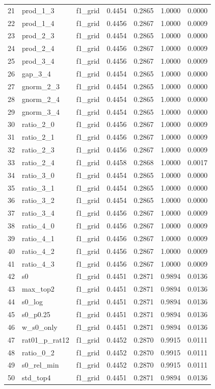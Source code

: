 \documentclass[11pt,a4paper]{article}
\begin{document}
\begin{table}[htbp]
\begin{tabular}{@{}rllrrrr@{}}
21 & prod\_1\_3 & f1\_grid & 0.4454 & 0.2865 & 1.0000 & 0.0000 \\
22 & prod\_1\_4 & f1\_grid & 0.4456 & 0.2867 & 1.0000 & 0.0009 \\
23 & prod\_2\_3 & f1\_grid & 0.4454 & 0.2865 & 1.0000 & 0.0000 \\
24 & prod\_2\_4 & f1\_grid & 0.4456 & 0.2867 & 1.0000 & 0.0009 \\
25 & prod\_3\_4 & f1\_grid & 0.4456 & 0.2867 & 1.0000 & 0.0009 \\
26 & gap\_3\_4 & f1\_grid & 0.4454 & 0.2865 & 1.0000 & 0.0000 \\
27 & gnorm\_2\_3 & f1\_grid & 0.4454 & 0.2865 & 1.0000 & 0.0000 \\
28 & gnorm\_2\_4 & f1\_grid & 0.4454 & 0.2865 & 1.0000 & 0.0000 \\
29 & gnorm\_3\_4 & f1\_grid & 0.4454 & 0.2865 & 1.0000 & 0.0000 \\
30 & ratio\_2\_0 & f1\_grid & 0.4456 & 0.2867 & 1.0000 & 0.0009 \\
31 & ratio\_2\_1 & f1\_grid & 0.4456 & 0.2867 & 1.0000 & 0.0009 \\
32 & ratio\_2\_3 & f1\_grid & 0.4456 & 0.2867 & 1.0000 & 0.0009 \\
33 & ratio\_2\_4 & f1\_grid & 0.4458 & 0.2868 & 1.0000 & 0.0017 \\
34 & ratio\_3\_0 & f1\_grid & 0.4454 & 0.2865 & 1.0000 & 0.0000 \\
35 & ratio\_3\_1 & f1\_grid & 0.4454 & 0.2865 & 1.0000 & 0.0000 \\
36 & ratio\_3\_2 & f1\_grid & 0.4454 & 0.2865 & 1.0000 & 0.0000 \\
37 & ratio\_3\_4 & f1\_grid & 0.4456 & 0.2867 & 1.0000 & 0.0009 \\
38 & ratio\_4\_0 & f1\_grid & 0.4456 & 0.2867 & 1.0000 & 0.0009 \\
39 & ratio\_4\_1 & f1\_grid & 0.4456 & 0.2867 & 1.0000 & 0.0009 \\
40 & ratio\_4\_2 & f1\_grid & 0.4456 & 0.2867 & 1.0000 & 0.0009 \\
41 & ratio\_4\_3 & f1\_grid & 0.4456 & 0.2867 & 1.0000 & 0.0009 \\
42 & s0 & f1\_grid & 0.4451 & 0.2871 & 0.9894 & 0.0136 \\
43 & max\_top2 & f1\_grid & 0.4451 & 0.2871 & 0.9894 & 0.0136 \\
44 & s0\_log & f1\_grid & 0.4451 & 0.2871 & 0.9894 & 0.0136 \\
45 & s0\_p0.25 & f1\_grid & 0.4451 & 0.2871 & 0.9894 & 0.0136 \\
46 & w\_s0\_only & f1\_grid & 0.4451 & 0.2871 & 0.9894 & 0.0136 \\
47 & rat01\_p\_rat12 & f1\_grid & 0.4452 & 0.2870 & 0.9915 & 0.0111 \\
48 & ratio\_0\_2 & f1\_grid & 0.4452 & 0.2870 & 0.9915 & 0.0111 \\
49 & s0\_rel\_min & f1\_grid & 0.4452 & 0.2870 & 0.9915 & 0.0111 \\
50 & std\_top4 & f1\_grid & 0.4451 & 0.2871 & 0.9894 & 0.0136 \\
\bottomrule
\end{tabular}
\end{table}
\end{document}
